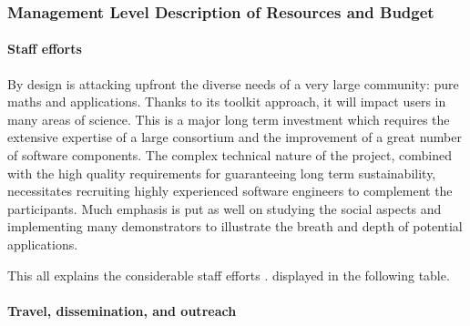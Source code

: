 

\subsubsection{Management Level Description of Resources and Budget}
\label{sect:budget-details}

\paragraph{Staff efforts}


By design \TheProject is attacking upfront the diverse needs of a
very large community: pure maths and applications. Thanks to its
toolkit approach, it will impact users in many areas of science. This
is a major long term investment which requires the extensive expertise
of a large consortium and the improvement of a great number of
software components. The complex technical nature of the project,
combined with the high quality requirements for guaranteeing long term
sustainability, necessitates recruiting highly experienced software
engineers to complement the participants. Much emphasis is put as well
on studying the social aspects and implementing many demonstrators to
illustrate the breath and depth of potential applications.

This all explains the considerable staff efforts%
\ifgrantagreement.\else{} %
displayed in the following table.
\wpfig[label=fig:staffeffort,caption=Summary of Staff Efforts]
\fi

\paragraph{Travel, dissemination, and outreach}


